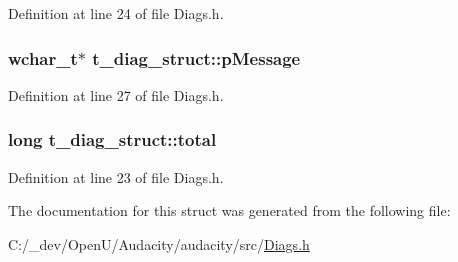 Definition at line 24 of file Diags.\+h.

\subsubsection[{\texorpdfstring{p\+Message}{pMessage}}]{ wchar\+\_\+t$\ast$ t\+\_\+diag\+\_\+struct\+::p\+Message}\hypertarget{structt__diag__struct_a562d49216f7ee3919f9525553b76f9fd}{}\label{structt__diag__struct_a562d49216f7ee3919f9525553b76f9fd}


Definition at line 27 of file Diags.\+h.

\subsubsection[{\texorpdfstring{total}{total}}]{\setlength{\rightskip}{0pt plus 5cm}long t\+\_\+diag\+\_\+struct\+::total}\hypertarget{structt__diag__struct_ade92ff5efbb9b559dd592f5eb60135df}{}\label{structt__diag__struct_ade92ff5efbb9b559dd592f5eb60135df}


Definition at line 23 of file Diags.\+h.



The documentation for this struct was generated from the following file\+:\begin{DoxyCompactItemize}
\item 
C\+:/\+\_\+dev/\+Open\+U/\+Audacity/audacity/src/\hyperlink{_diags_8h}{Diags.\+h}\end{DoxyCompactItemize}
